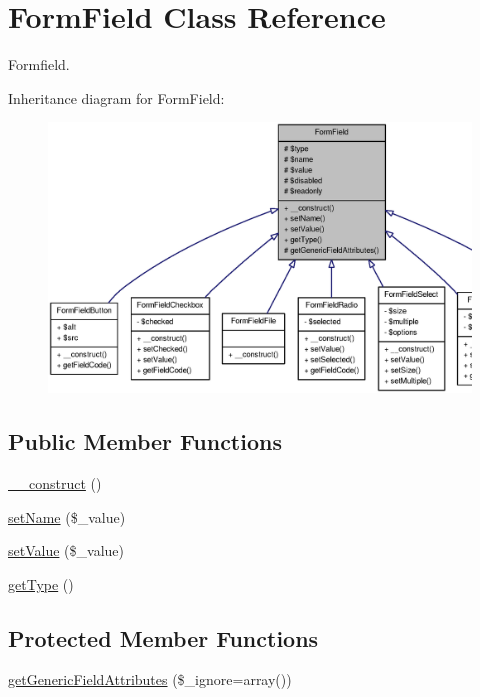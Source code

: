 \section{FormField Class Reference}
\label{classFormField}


Formfield.  




Inheritance diagram for FormField:\nopagebreak
\begin{figure}[H]
\begin{center}
\leavevmode
\includegraphics[width=400pt]{classFormField__inherit__graph}
\end{center}
\end{figure}
\subsection*{Public Member Functions}
\begin{DoxyCompactItemize}
\item 
\hyperlink{classFormField_a0cfe713ce28a6a0cb53476ed463e1f01}{\_\-\_\-construct} ()
\item 
\hyperlink{classFormField_ad57e32bd53170af060e869b3b60f0ef7}{setName} (\$\_\-value)
\item 
\hyperlink{classFormField_a465ff61e290d82be96bb793c3a14b3e7}{setValue} (\$\_\-value)
\item 
\hyperlink{classFormField_a1f64b737bccb6b2827f8c5665b9920c7}{getType} ()
\end{DoxyCompactItemize}
\subsection*{Protected Member Functions}
\begin{DoxyCompactItemize}
\item 
\hyperlink{classFormField_a9f9d136ba8b4a793f22370aff43d592d}{getGenericFieldAttributes} (\$\_\-ignore=array())
\end{DoxyCompactItemize}

